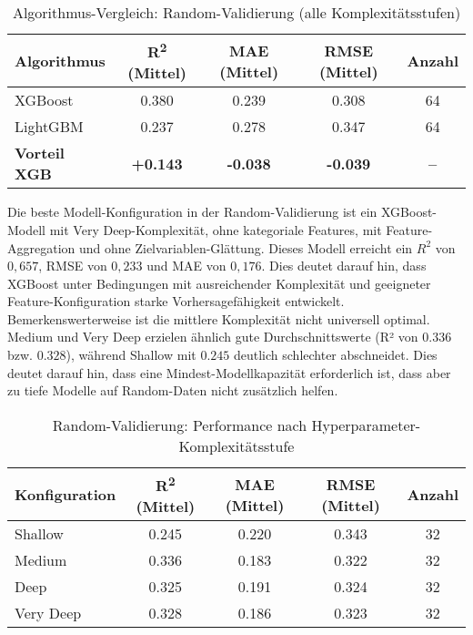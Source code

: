 \begin{table}[H]
  \centering
  \begin{tabular}{lcccc}
    \toprule
    \textbf{Algorithmus} & \textbf{R\textsuperscript{2} (Mittel)} & \textbf{MAE (Mittel)}  & \textbf{RMSE (Mittel)} & \textbf{Anzahl} \\
    \midrule
    XGBoost & 0.380 & 0.239 & 0.308 & 64 \\
    LightGBM & 0.237 & 0.278 & 0.347 & 64 \\
    \midrule
    \textbf{Vorteil XGB} & \textbf{+0.143} & \textbf{-0.038} & \textbf{-0.039} & \textbf{--} \\
    \bottomrule
  \end{tabular}
  \caption{Algorithmus-Vergleich: Random-Validierung (alle Komplexitätsstufen)}
  \label{tab:algo_random}
\end{table}

Die beste Modell-Konfiguration in der Random-Validierung ist ein XGBoost-Modell mit Very Deep-Komplexität, ohne kategoriale Features, mit Feature-Aggregation und ohne Zielvariablen-Glättung. Dieses Modell erreicht ein $R^2$ von $0{,}657$, RMSE von $0{,}233$ und MAE von $0{,}176$. Dies deutet darauf hin, dass XGBoost unter Bedingungen mit ausreichender Komplexität und geeigneter Feature-Konfiguration starke Vorhersagefähigkeit entwickelt. Bemerkenswerterweise ist die mittlere Komplexität nicht universell optimal. Medium und Very Deep erzielen ähnlich gute Durchschnittswerte (R² von $0.336$ bzw. $0.328$), während Shallow mit $0.245$ deutlich schlechter abschneidet. Dies deutet darauf hin, dass eine Mindest-Modellkapazität erforderlich ist, dass aber zu tiefe Modelle auf Random-Daten nicht zusätzlich helfen.

\begin{table}[H]
  \centering
  \begin{tabular}{lcccc}
    \toprule
  	\textbf{Konfiguration} & \textbf{R\textsuperscript{2} (Mittel)} & \textbf{MAE (Mittel)}  & \textbf{RMSE (Mittel)} & \textbf{Anzahl} \\
    \midrule
    Shallow & 0.245 & 0.220 & 0.343 & 32 \\
    Medium & 0.336 & 0.183 & 0.322 & 32 \\
    Deep & 0.325 & 0.191 & 0.324 & 32 \\
    Very Deep & 0.328 & 0.186 & 0.323 & 32 \\
    \bottomrule
  \end{tabular}
  \caption{Random-Validierung: Performance nach Hyperparameter-Komplexitätsstufe}
  \label{tab:complexity_random}
\end{table}

